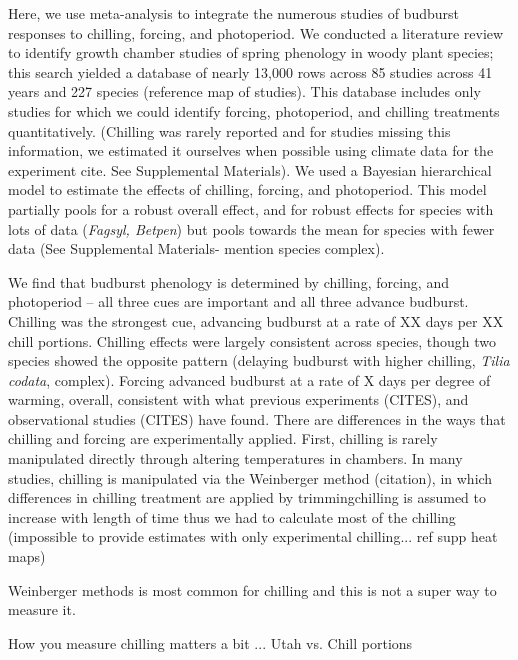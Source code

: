 \documentclass[11pt,letter]{article}
\begin{document}
\par Here, we use meta-analysis to integrate the numerous studies of budburst responses to chilling, forcing, and photoperiod. We conducted a literature review to identify growth chamber studies of spring phenology in woody plant species; this search yielded a database of nearly 13,000 rows across 85 studies across 41 years and 227 species (reference map of studies). %
This database includes only studies for which we could identify forcing, photoperiod, and chilling treatments quantitatively. (Chilling was rarely reported and for studies missing this information, we estimated it ourselves when possible using climate data for the experiment cite. See Supplemental Materials). We used a Bayesian hierarchical model to estimate the effects of chilling, forcing, and photoperiod. This model partially pools for a robust overall effect, and for robust effects for species with lots of data (\emph{Fagsyl, Betpen}) but pools towards the mean for species with fewer data (See Supplemental Materials- mention species complex).\\

\par We find that budburst phenology is determined by chilling, forcing, and photoperiod -- all three cues are important and all three advance budburst. Chilling was the strongest cue, advancing budburst at a rate of XX days per XX chill portions. Chilling effects were largely consistent across species, though two species showed the opposite pattern (delaying budburst with higher chilling, \emph{Tilia codata},  complex). Forcing advanced budburst at a rate of X days per degree of warming, overall, consistent with what previous experiments (CITES), and observational studies (CITES) have found. There are differences in the ways that chilling and forcing are experimentally applied. First, chilling is rarely manipulated directly through altering temperatures in chambers. In many studies, chilling is manipulated via the Weinberger method (citation), in which differences in chilling treatment are applied by trimmingchilling is assumed to increase with length of time  thus we had to calculate most of the chilling (impossible to provide estimates with only experimental chilling... ref supp heat maps)

\item Weinberger methods is most common for chilling and this is not a super way to measure it.
\item How you measure chilling matters a bit ... Utah vs. Chill portions
\end{document}
